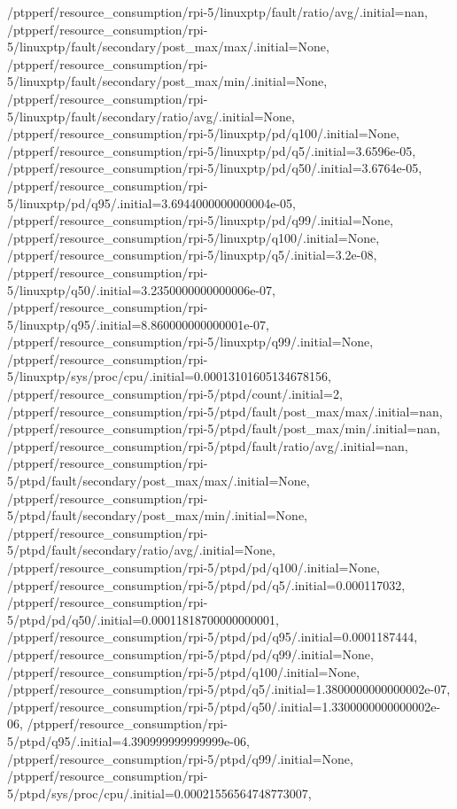 {    /ptpperf/resource_consumption/rpi-5/linuxptp/fault/ratio/avg/.initial=nan,
    /ptpperf/resource_consumption/rpi-5/linuxptp/fault/secondary/post_max/max/.initial=None,
    /ptpperf/resource_consumption/rpi-5/linuxptp/fault/secondary/post_max/min/.initial=None,
    /ptpperf/resource_consumption/rpi-5/linuxptp/fault/secondary/ratio/avg/.initial=None,
    /ptpperf/resource_consumption/rpi-5/linuxptp/pd/q100/.initial=None,
    /ptpperf/resource_consumption/rpi-5/linuxptp/pd/q5/.initial=3.6596e-05,
    /ptpperf/resource_consumption/rpi-5/linuxptp/pd/q50/.initial=3.6764e-05,
    /ptpperf/resource_consumption/rpi-5/linuxptp/pd/q95/.initial=3.6944000000000004e-05,
    /ptpperf/resource_consumption/rpi-5/linuxptp/pd/q99/.initial=None,
    /ptpperf/resource_consumption/rpi-5/linuxptp/q100/.initial=None,
    /ptpperf/resource_consumption/rpi-5/linuxptp/q5/.initial=3.2e-08,
    /ptpperf/resource_consumption/rpi-5/linuxptp/q50/.initial=3.2350000000000006e-07,
    /ptpperf/resource_consumption/rpi-5/linuxptp/q95/.initial=8.860000000000001e-07,
    /ptpperf/resource_consumption/rpi-5/linuxptp/q99/.initial=None,
    /ptpperf/resource_consumption/rpi-5/linuxptp/sys/proc/cpu/.initial=0.00013101605134678156,
    /ptpperf/resource_consumption/rpi-5/ptpd/count/.initial=2,
    /ptpperf/resource_consumption/rpi-5/ptpd/fault/post_max/max/.initial=nan,
    /ptpperf/resource_consumption/rpi-5/ptpd/fault/post_max/min/.initial=nan,
    /ptpperf/resource_consumption/rpi-5/ptpd/fault/ratio/avg/.initial=nan,
    /ptpperf/resource_consumption/rpi-5/ptpd/fault/secondary/post_max/max/.initial=None,
    /ptpperf/resource_consumption/rpi-5/ptpd/fault/secondary/post_max/min/.initial=None,
    /ptpperf/resource_consumption/rpi-5/ptpd/fault/secondary/ratio/avg/.initial=None,
    /ptpperf/resource_consumption/rpi-5/ptpd/pd/q100/.initial=None,
    /ptpperf/resource_consumption/rpi-5/ptpd/pd/q5/.initial=0.000117032,
    /ptpperf/resource_consumption/rpi-5/ptpd/pd/q50/.initial=0.00011818700000000001,
    /ptpperf/resource_consumption/rpi-5/ptpd/pd/q95/.initial=0.0001187444,
    /ptpperf/resource_consumption/rpi-5/ptpd/pd/q99/.initial=None,
    /ptpperf/resource_consumption/rpi-5/ptpd/q100/.initial=None,
    /ptpperf/resource_consumption/rpi-5/ptpd/q5/.initial=1.3800000000000002e-07,
    /ptpperf/resource_consumption/rpi-5/ptpd/q50/.initial=1.3300000000000002e-06,
    /ptpperf/resource_consumption/rpi-5/ptpd/q95/.initial=4.390999999999999e-06,
    /ptpperf/resource_consumption/rpi-5/ptpd/q99/.initial=None,
    /ptpperf/resource_consumption/rpi-5/ptpd/sys/proc/cpu/.initial=0.00021556564748773007,
}
